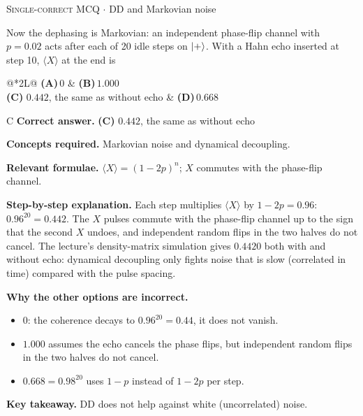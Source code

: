 \documentclass[11pt,a4paper]{article}
\newcommand{\optlabel}[1]{\textbf{(#1)}}
\newcommand{\correctlabel}[1]{\textcolor{okgreen}{\textbf{(#1)}\,\ding{51}}}
\newenvironment{qitem}[1]{\begin{list}{}{\setlength{\leftmargin}{3.3em}\setlength{\labelwidth}{3.1em}%
  \setlength{\labelsep}{0.2em}\setlength{\topsep}{3pt}\setlength{\parsep}{3pt}}\item[\textbf{Q.#1}\hfill]}{\end{list}}
\newcommand{\qsep}{\par\vspace{2pt}{\color{black!15}\hrule}\vspace{4pt}}
\newcommand{\qmeta}[2]{{\footnotesize\color{black!60}\textsc{#1} \;$\cdot$\; #2}\par}
\begin{document}
\begin{qitem}{69}
\qmeta{Single-correct MCQ}{DD and Markovian noise}
Now the dephasing is Markovian: an independent phase-flip channel with $p = 0.02$ acts after each of 20 idle steps on $\ket+$. With a Hahn echo inserted at step 10,
$\langle X\rangle$ at the end is
\par\smallskip\noindent\begin{tabularx}{\linewidth}{@{}*{2}{L}@{}}
\optlabel{A}\,$0$ & \optlabel{B}\,$1.000$ \\[3pt]
\correctlabel{C}\,$0.442$, the same as without echo & \optlabel{D}\,$0.668$
\end{tabularx}
\end{qitem}
\begin{solbox}{C}
\textbf{\color{brand}Correct answer.} \textcolor{okgreen}{\textbf{(C)}} $0.442$, the same as without echo

\textbf{\color{brand}Concepts required.} Markovian noise and dynamical decoupling.

\textbf{\color{brand}Relevant formulae.} $\langle X\rangle = (1-2p)^n$; $X$ commutes with the phase-flip channel.

\textbf{\color{brand}Step-by-step explanation.} Each step multiplies $\langle X\rangle$ by $1 - 2p = 0.96$: $0.96^{20} = 0.442$. The $X$ pulses commute with the phase-flip channel up to the sign that the second
$X$ undoes, and independent random flips in the two halves do not cancel. The lecture's density-matrix simulation gives $0.4420$ both with and without echo:
dynamical decoupling only fights noise that is slow (correlated in time) compared with the pulse spacing.

\textbf{\color{brand}Why the other options are incorrect.}
\begin{itemize}[leftmargin=2.4em, itemsep=1pt, topsep=2pt]
\item[\textbf{(A)}] $0$: the coherence decays to $0.96^{20} = 0.44$, it does not vanish.
\item[\textbf{(B)}] $1.000$ assumes the echo cancels the phase flips, but independent random flips in the two halves do not cancel.
\item[\textbf{(D)}] $0.668 = 0.98^{20}$ uses $1 - p$ instead of $1 - 2p$ per step.
\end{itemize}
\textbf{\color{brand}Key takeaway.} DD does not help against white (uncorrelated) noise.
\end{solbox}
\qsep
\end{document}
